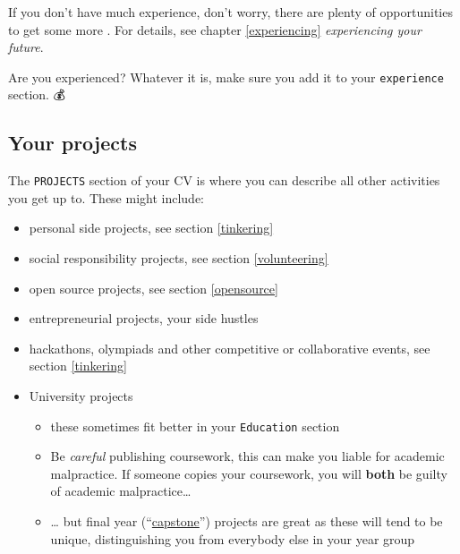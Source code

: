 \documentclass[
]{book}
\providecommand{\tightlist}{%
  \setlength{\itemsep}{0pt}\setlength{\parskip}{0pt}}
\begin{document}
If you don't have much experience, don't worry, there are plenty of opportunities to get some more . For details, see chapter \ref{experiencing} \emph{experiencing your future}.

Are you experienced? Whatever it is, make sure you add it to your \texttt{experience} section. 💰

\hypertarget{mycvpj}{%
\subsection{Your projects}\label{mycvpj}}

The \texttt{PROJECTS} section of your CV is where you can describe all other activities you get up to. These might include:

\begin{itemize}
\tightlist
\item
  personal side projects, see section \ref{tinkering}
\item
  social responsibility projects, see section \ref{volunteering}
\item
  open source projects, see section \ref{opensource}
\item
  entrepreneurial projects, your side hustles
\item
  hackathons, olympiads and other competitive or collaborative events, see section \ref{tinkering}
\item
  University projects

  \begin{itemize}
  \tightlist
  \item
    these sometimes fit better in your \texttt{Education} section
  \item
    Be \emph{careful} publishing coursework, this can make you liable for academic malpractice. If someone copies your coursework, you will \textbf{both} be guilty of academic malpractice\ldots{}
  \item
    \ldots{} but final year (``\href{https://en.wikipedia.org/wiki/Capstone_course}{capstone}'') projects are great as these will tend to be unique, distinguishing you from everybody else in your year group
  \end{itemize}
\end{itemize}
\end{document}
